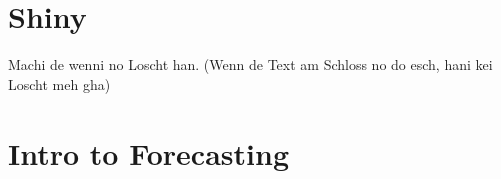 \documentclass[a4paper]{article}
\begin{document}
		\newpage
		
	\section{Shiny}
	
	Machi de wenni no Loscht han.
	(Wenn de Text am Schloss no do esch, hani kei Loscht meh gha)
	
	\section{Intro to Forecasting}
	
		
				
\end{document}
